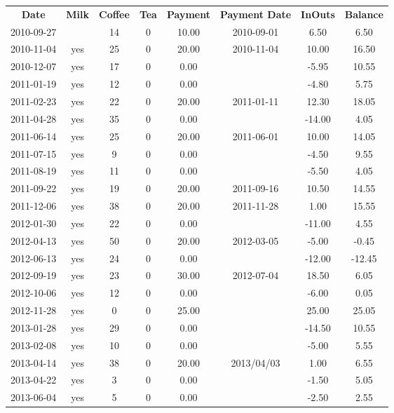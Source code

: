 \begin{center}
\begin{tabular}{cccccccc}
\textbf{Date} & \textbf{Milk} & \textbf{Coffee} & \textbf{Tea} & \textbf{Payment} & \textbf{Payment Date} & \textbf{InOuts} & \textbf{Balance} \\
2010-09-27 &  & 14 & 0 & 10.00 & 2010-09-01 &   6.50 &   6.50\\ 
2010-11-04 & yes & 25 & 0 & 20.00 & 2010-11-04 &  10.00 &  16.50\\ 
2010-12-07 & yes & 17 & 0 &  0.00 &  &  -5.95 &  10.55\\ 
2011-01-19 & yes & 12 & 0 &  0.00 &  &  -4.80 &   5.75\\ 
2011-02-23 & yes & 22 & 0 & 20.00 & 2011-01-11 &  12.30 &  18.05\\ 
2011-04-28 & yes & 35 & 0 &  0.00 &  & -14.00 &   4.05\\ 
2011-06-14 & yes & 25 & 0 & 20.00 & 2011-06-01 &  10.00 &  14.05\\ 
2011-07-15 & yes &  9 & 0 &  0.00 &  &  -4.50 &   9.55\\ 
2011-08-19 & yes & 11 & 0 &  0.00 &  &  -5.50 &   4.05\\ 
2011-09-22 & yes & 19 & 0 & 20.00 & 2011-09-16 &  10.50 &  14.55\\ 
2011-12-06 & yes & 38 & 0 & 20.00 & 2011-11-28 &   1.00 &  15.55\\ 
2012-01-30 & yes & 22 & 0 &  0.00 &  & -11.00 &   4.55\\ 
2012-04-13 & yes & 50 & 0 & 20.00 & 2012-03-05 &  -5.00 &  -0.45\\ 
2012-06-13 & yes & 24 & 0 &  0.00 &  & -12.00 & -12.45\\ 
2012-09-19 & yes & 23 & 0 & 30.00 & 2012-07-04 &  18.50 &   6.05\\ 
2012-10-06 & yes & 12 & 0 &  0.00 &  &  -6.00 &   0.05\\ 
2012-11-28 & yes &  0 & 0 & 25.00 &  &  25.00 &  25.05\\ 
2013-01-28 & yes & 29 & 0 &  0.00 &  & -14.50 &  10.55\\ 
2013-02-08 & yes & 10 & 0 &  0.00 &  &  -5.00 &   5.55\\ 
2013-04-14 & yes & 38 & 0 & 20.00 & 2013/04/03 &   1.00 &   6.55\\ 
2013-04-22 & yes &  3 & 0 &  0.00 &  &  -1.50 &   5.05\\ 
2013-06-04 & yes &  5 & 0 &  0.00 &  &  -2.50 &   2.55
\end{tabular}
\end{center}

